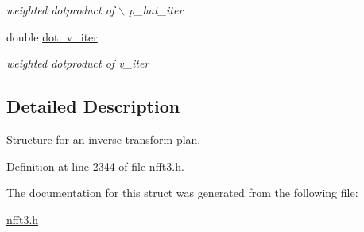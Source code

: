 \begin{CompactItemize}
\begin{CompactList}\small\item\em weighted dotproduct of $\backslash$ p\_\-hat\_\-iter \item\end{CompactList}\item 
\hypertarget{structimri__inh__2d1d__plan_o17}{
double \hyperlink{structimri__inh__2d1d__plan_o17}{dot\_\-v\_\-iter}}
\label{structimri__inh__2d1d__plan_o17}

\begin{CompactList}\small\item\em weighted dotproduct of v\_\-iter \item\end{CompactList}\end{CompactItemize}


\subsection{Detailed Description}
Structure for an inverse transform plan. 



Definition at line 2344 of file nfft3.h.

The documentation for this struct was generated from the following file:\begin{CompactItemize}
\item 
\hyperlink{nfft3_8h}{nfft3.h}\end{CompactItemize}
